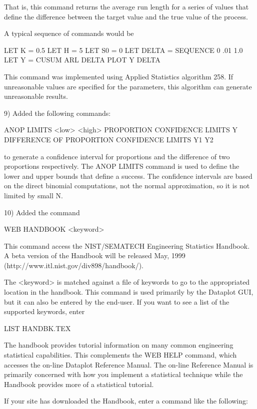 {       That is, this command returns the average run length for
       a series of values that define the difference between the
       target value and the true value of the process. 

       A typical sequence of commands would be

           LET K = 0.5
           LET H = 5
           LET S0 = 0
           LET DELTA = SEQUENCE 0 .01 1.0
           LET Y = CUSUM ARL DELTA
           PLOT Y DELTA

       This command was implemented using Applied Statistics
       algorithm 258.  If unreasonable values are specified for the
       parameters, this algorithm can generate unreasonable results.

 9) Added the following commands:

         ANOP LIMITS <low> <high>
         PROPORTION CONFIDENCE LIMITS Y
         DIFFERENCE OF PROPORTION CONFIDENCE LIMITS Y1 Y2

    to generate a confidence interval for proportions and the
    difference of two proportions respectively.  The ANOP
    LIMITS command is used to define the lower and upper bounds
    that define a success.  The confidence intervals are based 
    on the direct binomial computations, not the normal
    approximation, so it is not limited by small N.
   
10) Added the command

       WEB HANDBOOK <keyword>

    This command access the NIST/SEMATECH Engineering Statistics
    Handbook.  A beta version of the Handbook will be released
    May, 1999 (http://www.itl.nist.gov/div898/handbook/).

    The <keyword> is matched against a file of keywords to
    go to the appropriated location in the handbook.  This
    command is used primarily by the Dataplot GUI, but it can
    also be entered by the end-user.  If you want to see a list
    of the supported keywords, enter

        LIST HANDBK.TEX

    The handbook provides tutorial information on many common
    engineering statistical capabilities.  This complements the
    WEB HELP command, which accesses the on-line Dataplot Reference
    Manual.  The on-line Reference Manual is primarily concerned
    with how you implement a statistical technique while the
    Handbook provides more of a statistical tutorial.

    If your site has downloaded the Handbook, enter a command
    like the following:

}
